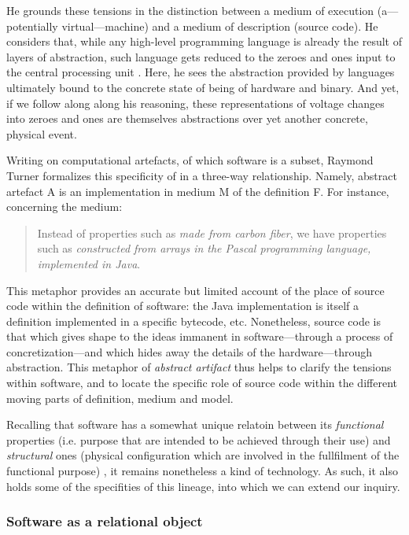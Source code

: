 He grounds these tensions in the distinction between a medium of execution (a—potentially virtual—machine) and a medium of description (source code). He considers that, while any high-level programming language is already the result of layers of abstraction, such language gets reduced to the zeroes and ones input to the central processing unit \citep{colburn_philosophy_2000}. Here, he sees the abstraction provided by languages ultimately bound to the concrete state of being of hardware and binary. And yet, if we follow along along his reasoning, these representations of voltage changes into zeroes and ones are themselves abstractions over yet another concrete, physical event.

Writing on computational artefacts, of which software is a subset, Raymond Turner formalizes this specificity of in a three-way relationship. Namely, abstract artefact A is an implementation in medium M of the definition F. For instance, concerning the medium:

\begin{quote}
    Instead of properties such as \emph{made from carbon fiber}, we have properties such as \emph{constructed from arrays in the Pascal programming language, implemented in Java}. \citep{turner_computational_2018}
\end{quote}

This metaphor provides an accurate but limited account of the place of source code within the definition of software: the Java implementation is itself a definition implemented in a specific bytecode, etc. Nonetheless, source code is that which gives shape to the ideas immanent in software—through a process of concretization—and which hides away the details of the hardware—through abstraction. This metaphor of \emph{abstract artifact} thus helps to clarify the tensions within software, and to locate the specific role of source code within the different moving parts of definition, medium and model.

Recalling that software has a somewhat unique relatoin between its \emph{functional} properties (i.e. purpose that are intended to be achieved through their use) and \emph{structural} ones (physical configuration which are involved in the fullfilment of the functional purpose) \citep{turner_computational_2018}, it remains nonetheless a kind of technology. As such, it also holds some of the specifities of this lineage, into which we can extend our inquiry.

\subsubsection{Software as a relational object}
\label{subsubsec:software-relational}

